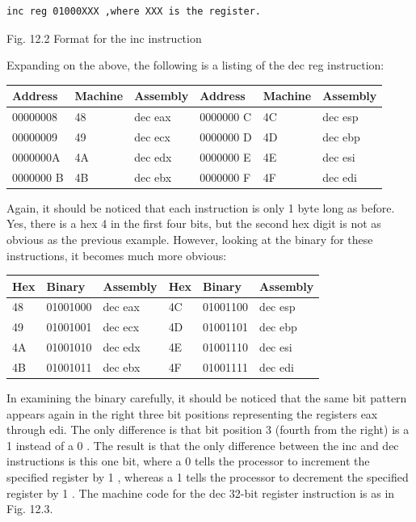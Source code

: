 \documentclass[10pt]{book}
\begin{document}
\begin{center}
\begin{center}
\begin{center}
\begin{center}
\begin{verbatim}
inc reg 01000XXX ,where XXX is the register.
\end{verbatim}

Fig. 12.2 Format for the inc instruction

Expanding on the above, the following is a listing of the dec reg instruction:

\begin{center}
\begin{tabular}{|l|l|l|l|l|l|}
\hline
Address & Machine & Assembly & Address & Machine & Assembly \\
\hline
00000008 & 48 & dec eax & 0000000 C & 4C & dec esp \\
\hline
00000009 & 49 & dec ecx & 0000000 D & 4D & dec ebp \\
\hline
0000000A & 4A & dec edx & 0000000 E & 4E & dec esi \\
\hline
0000000 B & 4B & dec ebx & 0000000 F & 4F & dec edi \\
\hline
\end{tabular}
\end{center}

Again, it should be noticed that each instruction is only 1 byte long as before. Yes, there is a hex 4 in the first four bits, but the second hex digit is not as obvious as the previous example. However, looking at the binary for these instructions, it becomes much more obvious:

\begin{center}
\begin{tabular}{|l|l|l|l|l|l|}
\hline
Hex & Binary & Assembly & Hex & Binary & Assembly \\
\hline
48 & 01001000 & dec eax & 4C & 01001100 & dec esp \\
\hline
49 & 01001001 & dec ecx & 4D & 01001101 & dec ebp \\
\hline
4A & 01001010 & dec edx & 4E & 01001110 & dec esi \\
\hline
4B & 01001011 & dec ebx & 4F & 01001111 & dec edi \\
\hline
\end{tabular}
\end{center}

In examining the binary carefully, it should be noticed that the same bit pattern appears again in the right three bit positions representing the registers eax through edi. The only difference is that bit position 3 (fourth from the right) is a 1 instead of a 0 . The result is that the only difference between the inc and dec instructions is this one bit, where a 0 tells the processor to increment the specified register by 1 , whereas a 1 tells the processor to decrement the specified register by 1 . The machine code for the dec 32-bit register instruction is as in Fig. 12.3.


\end{center}
\end{center}
\end{center}
\end{center}
\end{document}
